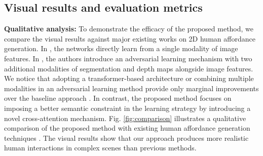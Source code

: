 \subsection{Visual results and evaluation metrics}
\label{sec:experiments_results}
\noindent
\textbf{Qualitative analysis:} To demonstrate the efficacy of the proposed method, we compare the visual results against major existing works \cite{wang2017binge, yao2023scene, zhang2022inpaint} on 2D human affordance generation. In \cite{wang2017binge, yao2023scene}, the networks directly learn from a single modality of image features. In \cite{zhang2022inpaint}, the authors introduce an adversarial learning mechanism with two additional modalities of segmentation and depth maps alongside image features. We notice that adopting a transformer-based architecture \cite{yao2023scene} or combining multiple modalities in an adversarial learning method \cite{zhang2022inpaint} provide only marginal improvements over the baseline approach \cite{wang2017binge}. In contrast, the proposed method focuses on imposing a better semantic constraint in the learning strategy by introducing a novel cross-attention mechanism. Fig. \ref{fig:comparison} illustrates a qualitative comparison of the proposed method with existing human affordance generation techniques \cite{wang2017binge, yao2023scene, zhang2022inpaint}. The visual results show that our approach produces more realistic human interactions in complex scenes than previous methods.

